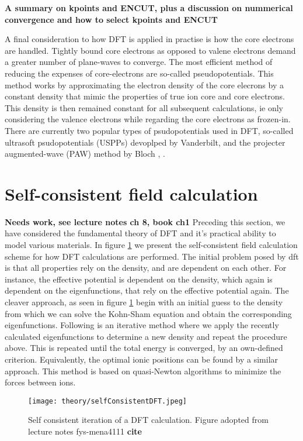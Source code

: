 \textbf{A summary on kpoints and ENCUT, plus a discussion on nummerical convergence and how to select kpoints and ENCUT}


A final consideration to how DFT is applied in practise is how the core electrons are handled. Tightly bound core electrons as opposed to valene electrons demand a greater number of plane-waves to converge. The most efficient method of reducing the expenses of core-electrons are so-called pseudopotentials. This method works by approximating the electron density of the core elecrons by a constant density that mimic the properties of true ion core and core electrons. This density is then remained constant for all subsequent calculations, ie only considering the valence electrons while regarding the core electrons as frozen-in. There are currently two popular types of psudopotentials used in DFT, so-called ultrasoft psudopotentials (USPPs) devoplped by Vanderbilt, and the projecter augmented-wave (PAW) method by Bloch \cite{PAW1}, \cite{PAW2}.

\section{Self-consistent field calculation}
\textbf{Needs work, see lecture notes ch 8, book ch1}
Preceding this section, we have considered the fundamental theory of DFT and it's practical ability to model various materials. In figure \ref{sfDFT} we present the self-consistent field calculation scheme for how DFT calculations are performed. The initial problem posed by dft is that all properties rely on the density, and are dependent on each other. For instance, the effective potential is dependent on the density, which again is dependent on the eigenfunctions, that rely on the effective potential again. The cleaver approach, as seen in figure \ref{sfDFT} begin with an initial guess to the density from which we can solve the Kohn-Sham equation and obtain the corresponding eigenfunctions. Following is an iterative method where we apply the recently calculated eigenfunctions to determine a new density and repeat the procedure above. This is repeated until the total energy is converged, by an own-defined criterion. Equivalently, the optimal ionic positions can be found by a similar approach. This method is based on quasi-Newton algorithms to minimize the forces between ions. 

\begin{figure}
\centering
\texttt{[image: theory/selfConsistentDFT.jpeg]}
\caption{Self consistent iteration of a DFT calculation. Figure adopted from lecture notes fys-mena4111 \textbf{cite}}
\label{sfDFT}
\end{figure}

